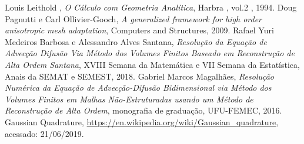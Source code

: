 \documentclass[10pt]{article}
\begin{document}
%
%
%
% 
% 
% 
% 
% 
% 
%
%
%

\begin{thebibliography}{1} 
Louis Leithold , \emph{O Cálculo com Geometria Analítica}, Harbra , vol.2 , 1994.
 Doug Pagnutti e Carl Ollivier-Gooch, \emph{A generalized framework for 
high order anisotropic mesh adaptation}, Computers and Structures, 2009. 
 Rafael Yuri Medeiros Barbosa e Alessandro Alves Santana, 
\emph{Resolução da Equação de Advecção Difusão Via Método 
dos Volumes Finitos Baseado em Reconstrução de Alta Ordem Santana}, XVIII Semana da Matemática e 
VII Semana da Estatística, Anais da SEMAT e SEMEST, 2018.
 Gabriel Marcos Magalhães, \emph{Resolução Numérica da Equação 
de Advecção-Difusão Bidimensional via Método dos Volumes Finitos em Malhas Não-Estruturadas 
usando um Método de Reconstrução de Alta Ordem}, monografia de graduação, UFU-FEMEC, 2016.
 Gaussian Quadrature, \url{https://en.wikipedia.org/wiki/Gaussian_quadrature}, 
acessado: 21/06/2019.
\end{thebibliography}
\end{document}
